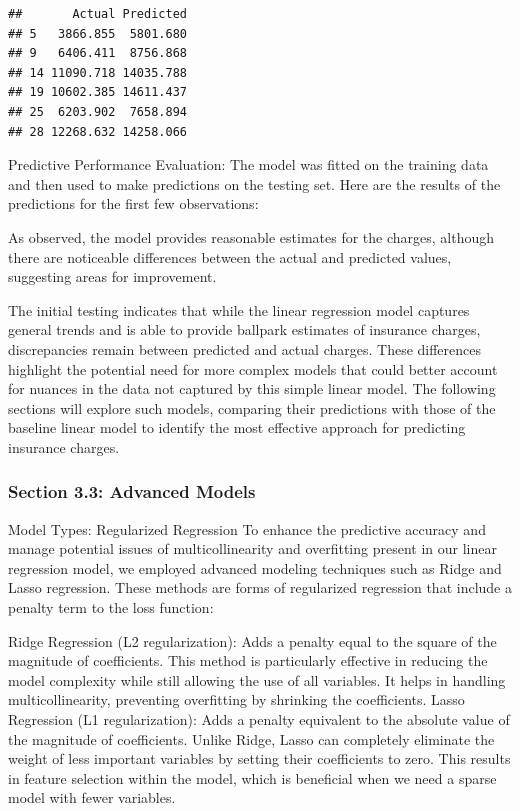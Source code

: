 \documentclass[
  12pt,
]{article}
\begin{document}
\begin{verbatim}
##       Actual Predicted
## 5   3866.855  5801.680
## 9   6406.411  8756.868
## 14 11090.718 14035.788
## 19 10602.385 14611.437
## 25  6203.902  7658.894
## 28 12268.632 14258.066
\end{verbatim}

Predictive Performance Evaluation: The model was fitted on the training
data and then used to make predictions on the testing set. Here are the
results of the predictions for the first few observations:

As observed, the model provides reasonable estimates for the charges,
although there are noticeable differences between the actual and
predicted values, suggesting areas for improvement.

The initial testing indicates that while the linear regression model
captures general trends and is able to provide ballpark estimates of
insurance charges, discrepancies remain between predicted and actual
charges. These differences highlight the potential need for more complex
models that could better account for nuances in the data not captured by
this simple linear model. The following sections will explore such
models, comparing their predictions with those of the baseline linear
model to identify the most effective approach for predicting insurance
charges.

\subsubsection{Section 3.3: Advanced
Models}\label{section-3.3-advanced-models}

Model Types: Regularized Regression To enhance the predictive accuracy
and manage potential issues of multicollinearity and overfitting present
in our linear regression model, we employed advanced modeling techniques
such as Ridge and Lasso regression. These methods are forms of
regularized regression that include a penalty term to the loss function:

Ridge Regression (L2 regularization): Adds a penalty equal to the square
of the magnitude of coefficients. This method is particularly effective
in reducing the model complexity while still allowing the use of all
variables. It helps in handling multicollinearity, preventing
overfitting by shrinking the coefficients. Lasso Regression (L1
regularization): Adds a penalty equivalent to the absolute value of the
magnitude of coefficients. Unlike Ridge, Lasso can completely eliminate
the weight of less important variables by setting their coefficients to
zero. This results in feature selection within the model, which is
beneficial when we need a sparse model with fewer variables.
\end{document}
